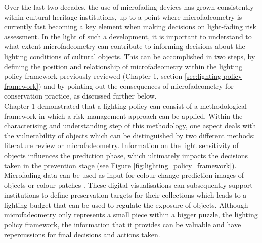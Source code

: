 Over the last two decades, the use of microfading devices has grown consistently within cultural heritage institutions, up to a point where microfadeometry is currently fast becoming a key element when making decisions on light-fading risk assessment. In the light of such a development, it is important to understand to what extent microfadeometry can contribute to informing decisions about the lighting conditions of cultural objects. This can be accomplished in two steps, by defining the position and relationship of microfadeometry within the lighting policy framework previously reviewed (Chapter 1, section \ref{sec:lighting policy framework}) and by pointing out the consequences of microfadeometry for conservation practice, as discussed further below.\\

Chapter 1 demonstrated that a lighting policy can consist of a methodological framework in which a risk management approach can be applied. Within the characterising and understanding step of this methodology, one aspect deals with the vulnerability of objects which can be distinguished by two different methods: literature review or microfadeometry. Information on the light sensitivity of objects influences the prediction phase, which ultimately impacts the decisions taken in the prevention stage (see Figure \ref{fig:lighting_policy_framework}). Microfading data can be used as input for colour change prediction images of objects \citep{morris_virtual_2007} or colour patches \citep[Figure 4]{pesme_presentation_2016}. These digital visualisations can subsequently support institutions to define preservation targets for their collections which leads to a lighting budget that can be used to regulate the exposure of objects. Although microfadeometry only represents a small piece within a bigger puzzle, \ie the lighting policy framework, the information that it provides can be valuable and have repercussions for final decisions and actions taken. \\


